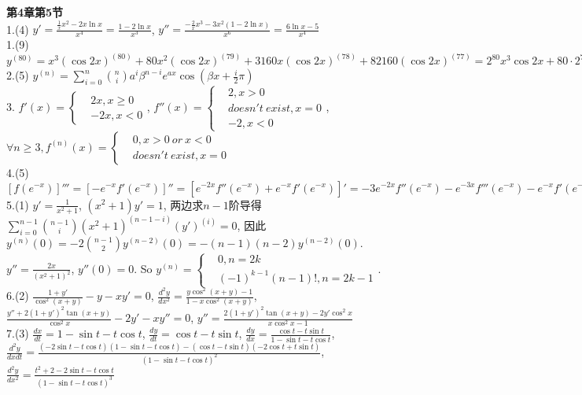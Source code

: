 \documentclass[12pt, a4paper, oneside]{ctexart}
\begin{document}
    \textbf{第4章第5节}\\
    1.(4) $y'=\frac{\frac1xx^2-2x\ln x}{x^4}=\frac{1-2\ln x}{x^3}$, $y''=\frac{-\frac2xx^3-3x^2(1-2\ln x)}{x^6}=\frac{6\ln x-5}{x^4}$\\
    1.(9) $y^{(80)}=x^3(\cos 2x)^{(80)}+80x^2(\cos 2x)^{(79)}+3160x(\cos 2x)^{(78)}+82160(\cos 2x)^{(77)}=2^{80}x^3\cos 2x+80\cdot2^{79}x^2\sin 2x-3160\cdot2^{78}x\cos 2x-82160\cdot2^{77}\sin 2x$\\
    2.(5) $y^{(n)}=\sum\limits_{i=0}^n\binom{n}{i}a^i\beta^{n-i}e^{ax}\cos(\beta x+\frac i2\pi)$\\
    3. $f'(x)=\left\{\begin{aligned}& 2x, x\geq 0\\& -2x, x<0\end{aligned}\right.$, $f''(x)=\left\{\begin{aligned}&2,x>0\\&doesn't~exist,x=0\\&-2,x<0\end{aligned}\right.$, $\forall n \geq 3,f^{(n)}(x)=\left\{\begin{aligned}&0,x>0~or~x<0\\&doesn't~exist,x=0\end{aligned}\right.$\\
    4.(5) $[f(e^{-x})]'''=[-e^{-x}f'(e^{-x})]''=[e^{-2x}f''(e^{-x})+e^{-x}f'(e^{-x})]'=-3e^{-2x}f''(e^{-x})-e^{-3x}f'''(e^{-x})-e^{-x}f'(e^{-x})$\\
    5.(1) $y'=\frac{1}{x^2+1}$, $(x^2+1)y'=1$, 两边求$n-1$阶导得 $\sum\limits_{i=0}^{n-1}\binom{n-1}{i}(x^2+1)^{(n-1-i)}(y')^{(i)}=0$, 因此 $y^{(n)}(0)=-2\binom{n-1}{2}y^{(n-2)}(0)=-(n-1)(n-2)y^{(n-2)}(0)$.$y''=\frac{2x}{(x^2+1)^2}$, $y''(0)=0$. So $y^{(n)}=\left\{\begin{aligned}&0,n=2k\\&(-1)^{k-1}(n-1)!,n=2k-1\end{aligned}\right.$.\\
    6.(2) $\frac{1+y'}{\cos^2(x+y)}-y-xy'=0$, $\frac{d^2y}{dx^2}=\frac{y\cos^2(x+y)-1}{1-x\cos^2(x+y)}$, $\frac{y''+2(1+y')^2\tan(x+y)}{\cos^2x}-2y'-xy''=0$, $y''=\frac{2(1+y')^2\tan(x+y)-2y'\cos^2x}{x\cos^2x-1}$\\
    7.(3) $\frac{dx}{dt}=1-\sin t-t\cos t$, $\frac{dy}{dt}=\cos t-t\sin t$, $\frac{dy}{dx}=\frac{\cos t-t\sin t}{1-\sin t-t\cos t}$, \\$\frac{d^2y}{dxdt}=\frac{(-2\sin t-t\cos t)(1-\sin t-t\cos t)-(\cos t-t\sin t)(-2\cos t+t\sin t)}{(1-\sin t-t\cos t)^2}$, $\frac{d^2y}{dx^2}=\frac{t^2+2-2\sin t-t\cos t}{(1-\sin t-t\cos t)^3}$\\
\end{document}
